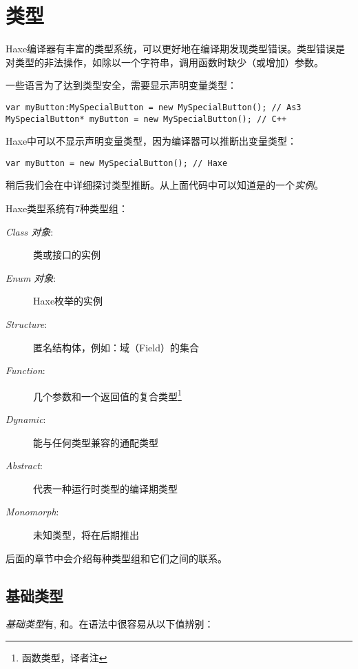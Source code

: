 \chapter{类型}
\label{types}

Haxe编译器有丰富的类型系统，可以更好地在编译期发现类型错误。类型错误是对类型的非法操作，如除以一个字符串，调用函数时缺少（或增加）参数。

一些语言为了达到类型安全，需要显示声明变量类型：

\begin{lstlisting}
var myButton:MySpecialButton = new MySpecialButton(); // As3
MySpecialButton* myButton = new MySpecialButton(); // C++ 
\end{lstlisting}
Haxe中可以不显示声明变量类型，因为编译器可以推断出变量类型：

\begin{lstlisting}
var myButton = new MySpecialButton(); // Haxe
\end{lstlisting}
稍后我们会在中详细探讨类型推断。从上面代码中可以知道是的一个\emph{实例}。

Haxe类型系统有7种类型组：

\begin{description}
 \item[\emph{Class 对象}:] 类或接口的实例
 \item[\emph{Enum 对象}:] Haxe枚举的实例
 \item[\emph{Structure}:] 匿名结构体，例如：域（Field）的集合
 \item[\emph{Function}:] 几个参数和一个返回值的复合类型\footnote{函数类型，译者注}
 \item[\emph{Dynamic}:] 能与任何类型兼容的通配类型
 \item[\emph{Abstract}:] 代表一种运行时类型的编译期类型
 \item[\emph{Monomorph}:] 未知类型，将在后期推出
\end{description}

后面的章节中会介绍每种类型组和它们之间的联系。


\section{基础类型}
\label{types-basic-types}

\emph{基础类型}有, 和。在语法中很容易从以下值辨别：

